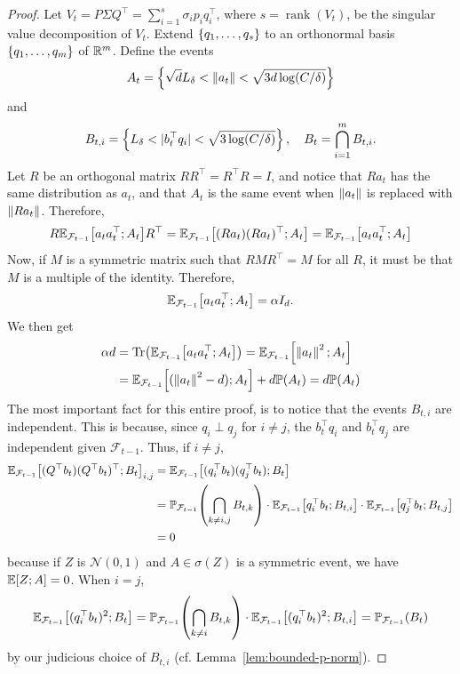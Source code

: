 \begin{proof}
    Let $V_t = P\Sigma Q^\top = \sum_{i=1}^s \sigma_i p_i q_i^\top$, where $s=\operatorname{rank}(V_t)$, be the singular value decomposition of $V_t$. Extend $\left\{q_1, \ldots, q_s\right\}$ to an orthonormal basis $\left\{q_1, \ldots, q_m\right\}$ of $\mathbb{R}^m$. Define the events
    \begin{align*}
        A_t = \left\{\sqrt{d} L_\delta < \left\lVert a_t \right\rVert < \sqrt{3d \log(C/\delta)}\right\}
    \end{align*}
    and
    \begin{align*}
        B_{t,i} = \left\{L_\delta < |b_t^\top q_i| < \sqrt{3\log(C/\delta)}\right\}, \quad B_t = \bigcap_{i=1}^m B_{t,i}.
    \end{align*}
    Let $R$ be an orthogonal matrix $RR^\top = R^\top R = I$, and notice that $Ra_t$ has the same distribution as $a_t$, and that $A_t$ is the same event when $\left\lVert a_t \right\rVert$ is replaced with $\left\lVert Ra_t \right\rVert$. Therefore,
    \begin{align*}
        R\mathbb{E}_{\mathcal F_{t-1}}\qty[a_ta_t^\top ; A_t]R^\top = \mathbb{E}_{\mathcal F_{t-1}}\qty[(Ra_t)(Ra_t)^\top ; A_t] = \mathbb{E}_{\mathcal F_{t-1}}\qty[a_ta_t^\top ; A_t]
    \end{align*}
    Now, if $M$ is a symmetric matrix such that $RMR^\top = M$ for all $R$, it must be that $M$ is a multiple of the identity. Therefore,
    \begin{align*}
        \mathbb{E}_{\mathcal F_{t-1}}\qty[a_ta_t^\top ; A_t] = \alpha I_d.
    \end{align*}
    We then get
    \begin{align*}
        \alpha d &= \Tr(\mathbb{E}_{\mathcal F_{t-1}}\qty[a_ta_t^\top ; A_t]) = \mathbb{E}_{\mathcal F_{t-1}}\qty[\left\lVert a_t \right\rVert^2 ; A_t] \\&= \mathbb{E}_{\mathcal F_{t-1}}\qty[(\left\lVert a_t \right\rVert^2 - d) ; A_t] + d \mathbb{P}\qty(A_t) = d\mathbb{P}\qty(A_t)
    \end{align*}
    The most important fact for this entire proof, is to notice that the events $B_{t,i}$ are independent. This is because, since $q_i \perp q_j$ for $i \neq j$, the $b_t^\top q_i$ and $b_t^\top q_j$ are independent given $\mathcal F_{t-1}$. Thus, if $i \neq j$,
    \begin{align*}
        \mathbb{E}_{\mathcal F_{t-1}}\qty[(Q^\top b_t)(Q^\top b_t)^\top ; B_t]_{i,j} &= \mathbb{E}_{\mathcal F_{t-1}}\qty[(q_i^\top b_t) (q_j^\top b_t) ; B_t] 
        \\&= \mathbb{P}_{\mathcal F_{t-1}}\qty(\bigcap_{k \neq i,j} B_{t,k}) \cdot \mathbb{E}_{\mathcal F_{t-1}}\qty[q_i^\top b_t ; B_{t,i}] \cdot \mathbb{E}_{\mathcal F_{t-1}}\qty[q_j^\top b_t ; B_{t,j}] \\
        &= 0
    \end{align*}
    because if $Z$ is $\mathcal N(0,1)$ and $A \in \sigma(Z)$ is a symmetric event, we have $\mathbb{E}\qty[Z ; A] = 0$. When $i=j$,
    \begin{align*}
        \mathbb{E}_{\mathcal F_{t-1}}\qty[(q_i^\top b_t)^2 ; B_t] = \mathbb{P}_{\mathcal F_{t-1}}\qty(\bigcap_{k \neq i} B_{t,k}) \cdot \mathbb{E}_{\mathcal F_{t-1}}\qty[(q_i^\top b_t)^2 ; B_{t,i}] = \mathbb{P}_{\mathcal F_{t-1}}\qty(B_t)
    \end{align*}
    by our judicious choice of $B_{t,i}$ (cf. Lemma~\ref{lem:bounded-p-norm}). 


\end{proof}
